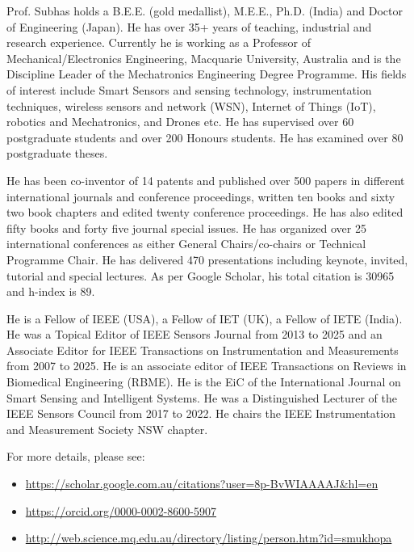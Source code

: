 \documentclass[10pt,a4paper]{article}
\begin{document}
Prof. Subhas holds a B.E.E. (gold medallist), M.E.E., Ph.D. (India) and Doctor of Engineering (Japan). He has over 35+ years of teaching, industrial and research experience. Currently he is working as a Professor of Mechanical/Electronics Engineering, Macquarie University, Australia and is the Discipline Leader of the Mechatronics Engineering Degree Programme. His fields of interest include Smart Sensors and sensing technology, instrumentation techniques, wireless sensors and network (WSN), Internet of Things (IoT), robotics and Mechatronics, and Drones etc. He has supervised over 60 postgraduate students and over 200 Honours students. He has examined over 80 postgraduate theses.

\vspace{1em}

He has been co-inventor of 14 patents and published over 500 papers in different international journals and conference proceedings, written ten books and sixty two book chapters and edited twenty conference proceedings. He has also edited fifty books and forty five journal special issues. He has organized over 25 international conferences as either General Chairs/co-chairs or Technical Programme Chair. He has delivered 470 presentations including keynote, invited, tutorial and special lectures. As per Google Scholar, his total citation is 30965 and h-index is 89.

\vspace{1em}

He is a Fellow of IEEE (USA), a Fellow of IET (UK), a Fellow of IETE (India). He was a Topical Editor of IEEE Sensors Journal from 2013 to 2025 and an Associate Editor for IEEE Transactions on Instrumentation and Measurements from 2007 to 2025. He is an associate editor of IEEE Transactions on Reviews in Biomedical Engineering (RBME). He is the EiC of the International Journal on Smart Sensing and Intelligent Systems. He was a Distinguished Lecturer of the IEEE Sensors Council from 2017 to 2022. He chairs the IEEE Instrumentation and Measurement Society NSW chapter.

\vspace{1em}

For more details, please see:
    \begin{itemize}
        \item \url{https://scholar.google.com.au/citations?user=8p-BvWIAAAAJ\&hl=en} 
        \item \url{https://orcid.org/0000-0002-8600-5907} 
        \item \url{http://web.science.mq.edu.au/directory/listing/person.htm?id=smukhopa}
    \end{itemize}
\end{document}
